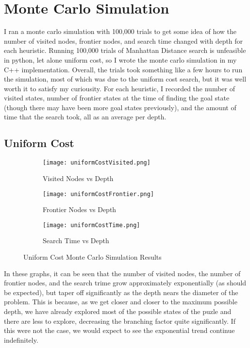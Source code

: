 \documentclass{article}
\begin{document}
\section{Monte Carlo Simulation}
I ran a monte carlo simulation with 100,000 trials to get some idea of how the number of visited nodes, frontier nodes, and search time changed with depth for each heuristic. Running 100,000 trials of Manhattan Distance search is unfeasible in python, let alone uniform cost, so I wrote the monte carlo simulation in my C++ implementation. Overall, the trials took something like a few hours to run the simulation, most of which was due to the uniform cost search, but it was well worth it to satisfy my curiousity.  For each heuristic, I recorded the number of visited states, number of frontier states at the time of finding the goal state (though there may have been more goal states previously), and the amount of time that the search took, all as an average per depth.
\subsection{Uniform Cost}
\begin{figure}[ht]
	\centering
	\begin{subfigure}[b]{0.32\textwidth}
		\centering
		\texttt{[image: uniformCostVisited.png]}
		\caption{Visited Nodes vs Depth}
		\label{fig:Uniform Cost Visited Nodes}
	\end{subfigure}
	\hfill
	\begin{subfigure}[b]{0.32\textwidth}
		\centering
		\texttt{[image: uniformCostFrontier.png]}
		\caption{Frontier Nodes vs Depth}
		\label{fig:Uniform Cost Frontier Nodes}
	\end{subfigure}
	\hfill
	\begin{subfigure}[b]{0.32\textwidth}
		\centering
		\texttt{[image: uniformCostTime.png]}
		\caption{Search Time vs Depth}
		\label{fig:Uniform Cost Frontier Nodes}
	\end{subfigure}
	\caption{Uniform Cost Monte Carlo Simulation Results}
	\label{fig:Uniform Cost Monte Carlo Simulation}
\end{figure}
In these graphs, it can be seen that the number of visited nodes, the number of frontier nodes, and the search trime grow approximately exponentially (as should be expected), but taper off significantly as the depth nears the diameter of the problem. This is because, as we get closer and closer to the maximum possible depth, we have already explored most of the possible states of the puzle and there are less to explore, decreasing the branching factor quite significantly. If this were not the case, we would expect to see the exponential trend continue indefinitely.
\end{document}
